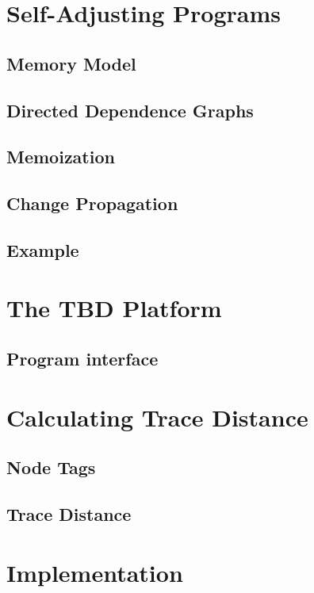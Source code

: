 
\chapter{Self-Adjusting Programs}
\label{ch:self_adjusting}

\section{Memory Model}

\section{Directed Dependence Graphs}

\section{Memoization}

\section{Change Propagation}

\section{Example}

\chapter{The TBD Platform}
\label{ch:tbd_platform}

\section{Program interface}

\chapter{Calculating Trace Distance}
\label{ch:implementation}

\section{Node Tags}

\section{Trace Distance}

\chapter{Implementation}
\label{ch:impl}

